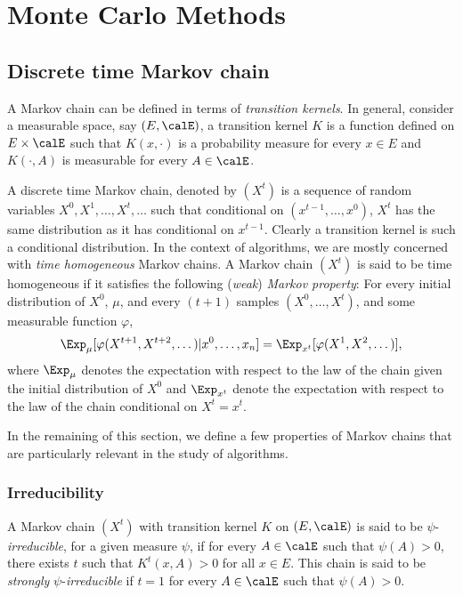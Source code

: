 \chapter{Monte Carlo Methods}
\label{cha:Appendix Monte Carlo Methods}

\section{Discrete time Markov chain}
\label{sec:Appendix Discrete time Markov chain}

A Markov chain can be defined in terms of \emph{transition kernels}. In general, consider a measurable space, say $(E,\calE)$, a transition kernel $K$ is a function defined on $E\times\calE$ such that $K(x,\cdot)$ is a probability measure for every $x\in E$ and $K(\cdot,A)$ is measurable for every $A\in\calE$.

A discrete time Markov chain, denoted by $(X^t)$ is a sequence of random variables $X^0,X^1,\dots,X^t,\dots$ such that conditional on $(x^{t-1},\dots,x^0)$, $X^t$ has the same distribution as it has conditional on $x^{t-1}$. Clearly a transition kernel is such a conditional distribution. In the context of \mcmc algorithms, we are mostly concerned with \emph{time homogeneous} Markov chains. A Markov chain $(X^t)$ is said to be time homogeneous if it satisfies the following (\emph{weak}) \emph{Markov property}: For every initial distribution of $X^0$, $\mu$, and every $(t+1)$ samples $(X^0,\dots,X^t)$, and some measurable function $\varphi$,
\begin{equation}
  \Exp_{\mu}[\varphi(X^{t+1},X^{t+2},\dots)|x^0,\dots,x_n] =
  \Exp_{x^t}[\varphi(X^1,X^2,\dots)],
\end{equation}
where $\Exp_{\mu}$ denotes the expectation with respect to the law of the chain given the initial distribution of $X^0$ and $\Exp_{x^t}$ denote the expectation with respect to the law of the chain conditional on $X^t = x^t$.

In the remaining of this section, we define a few properties of Markov chains that are particularly relevant in the study of \mcmc algorithms.

\subsection{Irreducibility}
\label{sub: Appdendix Irreducibility}

A Markov chain $(X^t)$ with transition kernel $K$ on $(E,\calE)$ is said to be $\psi$-\emph{irreducible}, for a given measure $\psi$, if for every $A\in\calE$ such that $\psi(A)>0$, there exists $t$ such that $K^t(x,A)>0$ for all $x\in E$. This chain is said to be \emph{strongly} $\psi$-\emph{irreducible} if $t=1$ for every $A\in\calE$ such that $\psi(A)>0$.

